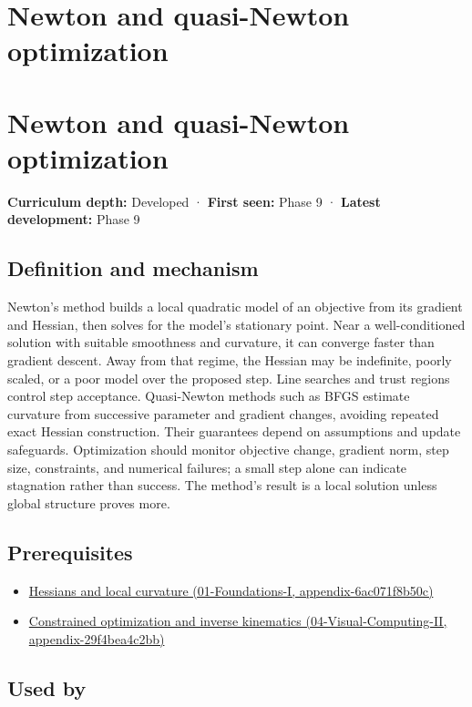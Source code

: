 \hypertarget{appendix-54c8f5828387}{}
\section*{Newton and quasi-Newton optimization}
\section{Newton and quasi-Newton optimization}\label{newton-and-quasi-newton-optimization}

\textbf{Curriculum depth:} Developed · \textbf{First seen:} Phase 9 · \textbf{Latest development:} Phase 9

\subsection{Definition and mechanism}\label{definition-and-mechanism}

Newton's method builds a local quadratic model of an objective from its gradient and Hessian, then solves for the model's stationary point. Near a well-conditioned solution with suitable smoothness and curvature, it can converge faster than gradient descent. Away from that regime, the Hessian may be indefinite, poorly scaled, or a poor model over the proposed step. Line searches and trust regions control step acceptance. Quasi-Newton methods such as BFGS estimate curvature from successive parameter and gradient changes, avoiding repeated exact Hessian construction. Their guarantees depend on assumptions and update safeguards. Optimization should monitor objective change, gradient norm, step size, constraints, and numerical failures; a small step alone can indicate stagnation rather than success. The method's result is a local solution unless global structure proves more.

\subsection{Prerequisites}\label{prerequisites}

\begin{itemize}
\tightlist
\item
  \href{}{Hessians and local curvature (01-Foundations-I, appendix-6ac071f8b50c)}
\item
  \href{}{Constrained optimization and inverse kinematics (04-Visual-Computing-II, appendix-29f4bea4c2bb)}
\end{itemize}

\subsection{Used by}\label{used-by}

